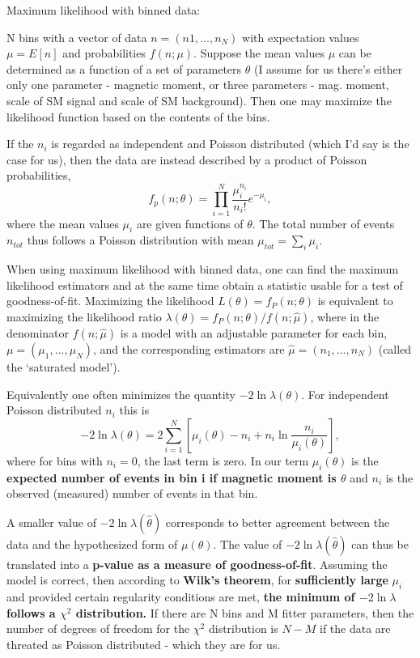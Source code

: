 Maximum likelihood with binned data:

N bins with a vector of data $n=\left(n1,...,n_N \right)$ with expectation values $\mu=E\left[n\right]$ and probabilities $f\left(n;\mu\right)$. Suppose the mean values $\mu$ can be determined as a function of a set of parameters $\theta$ (I assume for us there's either only one parameter - magnetic moment, or three parameters - mag. moment, scale of SM signal and scale of SM background). Then one may maximize the likelihood function based on the contents of the bins.

If the $n_i$ is regarded as independent and Poisson distributed (which I'd say is the case for us), then the data are instead described by a product of Poisson probabilities,
\begin{equation}
f_p\left(n;\theta\right)=\prod_{i=1}^{N} \frac{\mu_i^{n_i}}{n_i!}e^{-\mu_i},
\end{equation}
where the mean values $\mu_i$ are given functions of $\theta$. The total number of events $n_{tot}$ thus follows a Poisson distribution with mean $\mu_{tot}=\sum_i \mu_i$.

When using maximum likelihood with binned data, one can find the maximum likelihood estimators and at the same time obtain a statistic usable for a test of goodness-of-fit. Maximizing the likelihood $L\left(\theta\right)=f_P\left(n;\theta\right)$ is equivalent to maximizing the likelihood ratio $\lambda\left(\theta\right)=f_P\left(n;\theta\right) / f\left(n;\hat{\mu}\right)$, where in the denominator $f\left(n;\hat{\mu}\right)$ is a model with an adjustable parameter for each bin, $\mu=\left(\mu_1,...,\mu_N\right)$, and the corresponding estimators are $\hat{\mu}=\left(n_1,...,n_N\right)$ (called the `saturated model').

Equivalently one often minimizes the quantity $-2\ln\lambda\left(\theta\right)$. For independent Poisson distributed $n_i$ this is
\begin{equation}
-2\ln\lambda\left(\theta\right)=2\sum_{i=1}^{N}\left[\mu_i\left(\theta\right)-n_i+n_i\ln\frac{n_i}{\mu_i\left(\theta\right)}\right],
\end{equation}
where for bins with $n_i=0$, the last term is zero. In our term $\mu_i\left(\theta\right)$ is the \textbf{expected number of events in bin i if magnetic moment is $\theta$} and $n_i$ is the observed (measured) number of events in that bin.

A smaller value of $-2\ln\lambda\left(\hat{\theta}\right)$ corresponds to better agreement between the data and the hypothesized form of $\mu\left(\theta\right)$. The value of $-2\ln\lambda\left(\hat{\theta}\right)$ can thus be translated into a \textbf{p-value as a measure of goodness-of-fit}. Assuming the model is correct, then according to \textbf{Wilk's theorem}, for \textbf{sufficiently large} $\mu_i$ and provided certain regularity conditions are met, \textbf{the minimum of $-2\ln\lambda$ follows a $\chi^2$ distribution.} If there are N bins and M fitter parameters, then the number of degrees of freedom for the $\chi^2$ distribution is $N-M$ if the data are threated as Poisson distributed - which they are for us.

